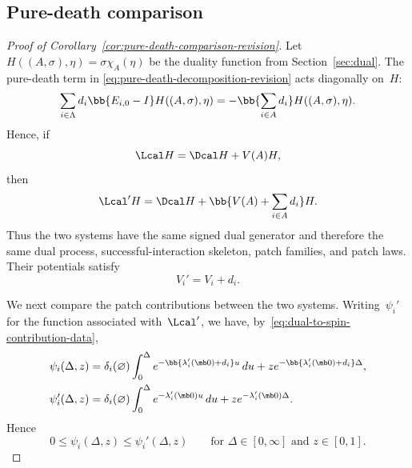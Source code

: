 
\subsection{Pure-death comparison}
\label{subsec:proof-pure-death-comparison}

\begin{proof}[Proof of Corollary~\ref{cor:pure-death-comparison-revision}]
Let~$H((A,\sigma),\eta)=\sigma\chi_A(\eta)$ be the duality function from
Section~\ref{sec:dual}. The pure-death term in
\eqref{eq:pure-death-decomposition-revision} acts diagonally on~$H$:
\begin{equation*}
\sum_{i\in\Lambda}d_i\bb{E_{i,0}-I}H((A,\sigma),\eta)
=
-\bb{\sum_{i\in A}d_i}H((A,\sigma),\eta).
\end{equation*}
Hence, if
\begin{equation*}
\Lcal H
=
\Dcal H+V(A)H,
\end{equation*}
then
\begin{equation*}
\Lcal'H
=
\Dcal H
+
\bb{V(A)+\sum_{i\in A}d_i}H.
\end{equation*}
Thus the two systems have the same signed dual generator and therefore the same
dual process, successful-interaction skeleton, patch families, and
patch laws. Their potentials satisfy
\begin{equation}
\label{eq:pure-death-potential-comparison}
V_i'=V_i+d_i.
\end{equation}

We next compare the patch contributions between the two systems. Writing~$\psi_i'$ for the function associated with~$\Lcal'$, we
have, by~\eqref{eq:dual-to-spin-contribution-data},
\begin{align*}
\psi_i(\Delta,z)
&=
\delta_i(\varnothing)
\int_0^\Delta
e^{-\bb{\lambda_i'(\mb 0)+d_i}u}\,du
+
z e^{-\bb{\lambda_i'(\mb 0)+d_i}\Delta},
\\
\psi_i'(\Delta,z)
&=
\delta_i(\varnothing)
\int_0^\Delta
e^{-\lambda_i'(\mb 0)u}\,du
+
z e^{-\lambda_i'(\mb 0)\Delta}.
\end{align*}
Hence
\begin{equation}
\label{eq:pure-death-psi-comparison}
0\leq\psi_i(\Delta,z)\leq\psi_i'(\Delta,z)
\qquad
\text{for }\Delta\in[0,\infty]\text{ and }z\in[0,1].
\end{equation}


\end{proof}
